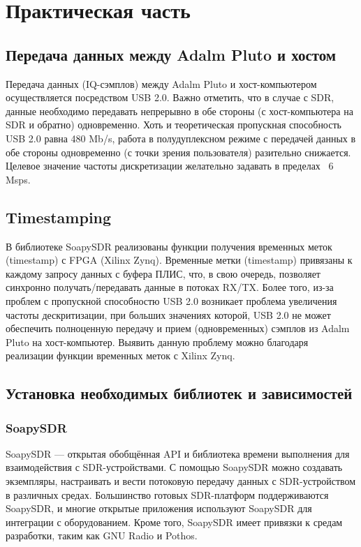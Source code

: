 \chapter{Практическая часть}
\label{ch:chap2}

\section{Передача данных между Adalm Pluto и хостом}

Передача данных (IQ-сэмплов) между Adalm Pluto и хост-компьютером осуществляется посредством USB 2.0. Важно отметить, 
что в случае с SDR, данные необходимо передавать непрерывно в обе стороны (с хост-компьютера на SDR и обратно) одновременно. 
Хоть и теоретическая пропускная способность USB 2.0 равна 480 Mb/s, работа в полудуплексном режиме с передачей данных в 
обе стороны одновременно (с точки зрения пользователя) разительно снижается. Целевое значение частоты дискретизации 
желательно задавать в пределах ~6 Msps.

\section{Timestamping}

В библиотеке SoapySDR реализованы функции получения временных меток (timestamp) с FPGA (Xilinx Zynq). Временные метки (timestamp) привязаны к каждому запросу 
данных с буфера ПЛИС, что, в свою очередь, позволяет синхронно получать/передавать данные в потоках RX/TX. Более того, 
из-за проблем с пропускной способностю USB 2.0 возникает проблема увеличения частоты дескритизации, при больших значениях которой,
USB 2.0 не может обеспечить полноценную передачу и прием (одновременных) сэмплов из Adalm Pluto на хост-компьютер. 
Выявить данную проблему можно благодаря реализации функции временных меток с Xilinx Zynq.

\section{Установка необходимых библиотек и зависимостей}

\subsection{SoapySDR}

SoapySDR — открытая обобщённая API и библиотека времени выполнения для взаимодействия с SDR-устройствами. 
С помощью SoapySDR можно создавать экземпляры, настраивать и вести потоковую передачу данных с SDR-устройством в различных средах.
Большинство готовых SDR-платформ поддерживаются SoapySDR, и многие открытые приложения используют SoapySDR для интеграции с 
оборудованием. Кроме того, SoapySDR имеет привязки к средам разработки, таким как GNU Radio и Pothos.

